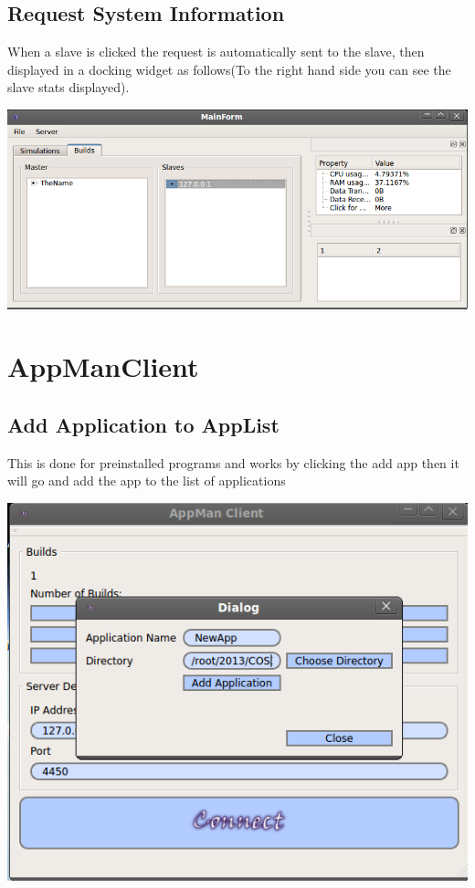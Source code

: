 \documentclass[a4paper,12pt,final]{article}
\begin{document}
\subsection{Request System Information}
When a slave is clicked the request is automatically sent to the slave, then displayed in a docking widget as follows(To the right hand side you can see the slave stats displayed).

\begin{center}
  	\includegraphics[scale=0.4]{SlaveStats.png}
 \end{center}

\section{AppManClient}

\subsection{Add Application to AppList}
This is done for preinstalled programs and works by clicking the add app then it will go and add the app to the list of applications

\begin{center}
  	\includegraphics[scale=0.4]{AddAppToList.png}
 \end{center}
 
\end{document}
